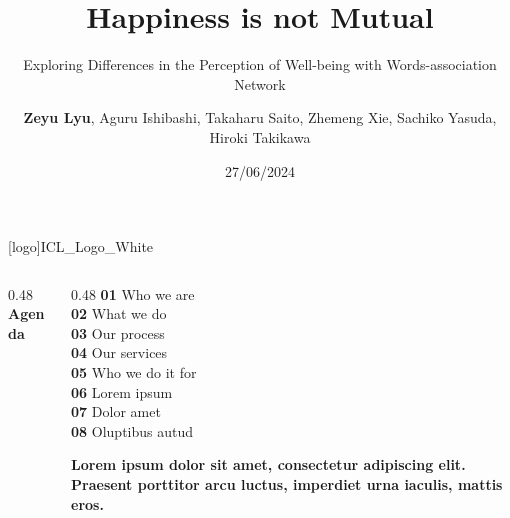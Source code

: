\documentclass[
	aspectratio=169, %
	t, %
	onlytextwidth, %
	10pt, %
]{beamer}
\title{Happiness is not Mutual} %
\subtitle{Exploring Differences in the Perception of Well-being with Words-association Network} %
\author{\textbf{Zeyu Lyu}, Aguru Ishibashi, Takaharu Saito, Zhemeng Xie, Sachiko Yasuda, Hiroki Takikawa} %
\date{27/06/2024} %
\begin{document}




\begingroup
	[logo]{ICL_Logo_White} %
	\frame[plain, s]{\titlepage} %
\endgroup




\begingroup
	
	\begin{frame}
		\begin{columns}[T] %
			\begin{column}{0.48\linewidth} %
				\HUGE\textbf{Agenda}
			\end{column}
			\begin{column}{0.48\linewidth} %
				\textbf{01} Who we are\\ %
				\textbf{02} What we do\\
				\textbf{03} Our process\\
				\textbf{04} Our services\\
				\textbf{05} Who we do it for\\
				\textbf{06} Lorem ipsum\\
				\textbf{07} Dolor amet\\
				\textbf{08} Oluptibus autud
				
				\textbf{Lorem ipsum dolor sit amet, consectetur adipiscing elit. Praesent porttitor arcu luctus, imperdiet urna iaculis, mattis eros.}
			\end{column}
		\end{columns}
	\end{frame}
\endgroup
\end{document}

